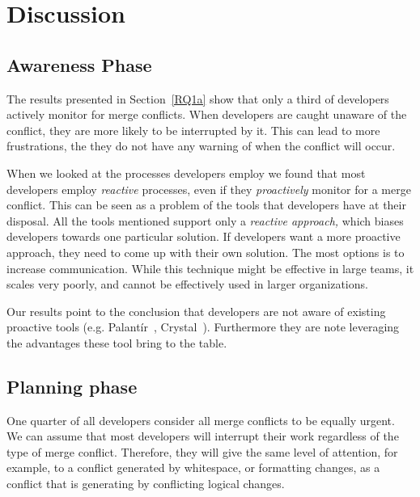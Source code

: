 
\section{Discussion}\label{discussion}

\subsection{Awareness Phase}

The results presented in Section~\ref{RQ1a} show that only a third of developers actively monitor for merge conflicts.
When developers are caught unaware of the conflict, they are more likely to be interrupted by it.
This can lead to more frustrations, the they do not have any warning of when the conflict will occur.

When we looked at the processes developers employ we found that most developers employ \emph{reactive} processes, even if they \emph{proactively} monitor for a merge conflict.
This can be seen as a problem of the tools that developers have at their disposal.
All the tools mentioned support only a \emph{reactive approach,} which biases developers towards one particular solution.
If developers want a more proactive approach, they need to come up with their own solution.
The most options is to increase communication.
While this technique might be effective in large teams, it scales very poorly, and cannot be effectively used in larger organizations. 

Our results point to the conclusion that developers are not aware of existing proactive tools (e.g. Palant\'{i}r~\cite{sarma_palantir:_2003}, Crystal~\cite{Brun2011}).
Furthermore they are note leveraging the advantages these tool bring to the table. %

\subsection{Planning phase}

One quarter of all developers consider all merge conflicts to be equally urgent.
We can assume that most developers will interrupt their work regardless of the type of merge conflict.
Therefore, they will give the same level of attention, for example, to a conflict generated by whitespace, or formatting changes, as a conflict that is generating by conflicting logical changes. 


